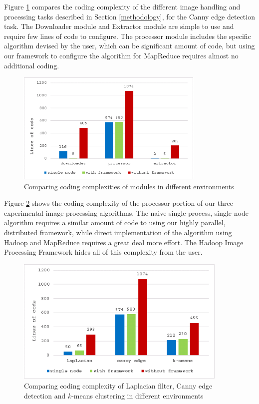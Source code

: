 \documentclass{osuthesis}
\begin{document}
				Figure \ref{fig:module-chart} compares the coding complexity of the
				different image handling and processing tasks described in Section
				\ref{methodology}, for the Canny edge detection task. The Downloader
				module and Extractor module are simple to use and require few lines of
				code to configure. The processor module includes the specific
				algorithm devised by the user, which can be significant amount of
				code, but using our framework to configure the algorithm for MapReduce
				requires almost no additional coding.
				
				\begin{figure}[h]
					\centering
					\includegraphics[width=0.80\textwidth]{module-chart2}
					\caption{Comparing coding complexities of modules in different
						environments}
					\label{fig:module-chart}
				\end{figure}
				
				Figure \ref{fig:comp-chart} shows the coding complexity of the
				processor portion of our three experimental image processing
				algorithms.  The naive single-process, single-node algorithm requires
				a similar amount of code to using our highly parallel, distributed
				framework, while direct implementation of the algorithm using Hadoop
				and MapReduce requires a great deal more effort.  The Hadoop Image
				Processing Framework hides all of this complexity from the user.
				
				\begin{figure}[h]
					\centering
					\includegraphics[width=0.90\textwidth]{comp-chart}
					\caption{Comparing coding complexity of Laplacian filter,
						Canny edge detection and $k$-means clustering in different
						environments}
					\label{fig:comp-chart}
				\end{figure}
				
\end{document}
